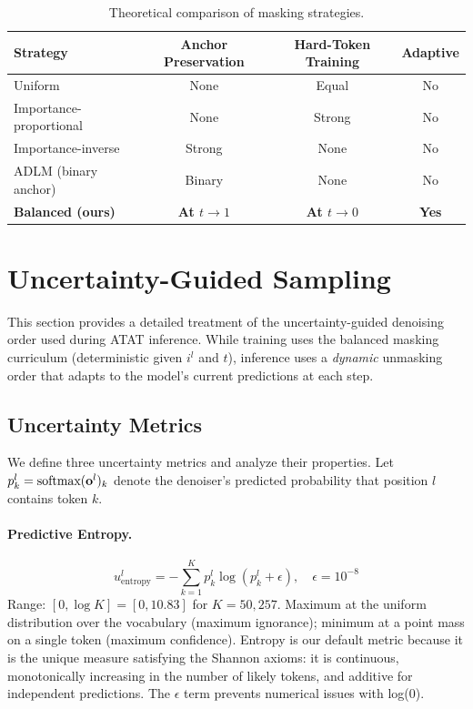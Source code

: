 \begin{table}[h]
\centering
\caption{Theoretical comparison of masking strategies.}
\begin{tabular}{lccc}
\toprule
\textbf{Strategy} & \textbf{Anchor Preservation} & \textbf{Hard-Token Training} & \textbf{Adaptive} \\
\midrule
Uniform & None & Equal & No \\
Importance-proportional & None & Strong & No \\
Importance-inverse & Strong & None & No \\
ADLM (binary anchor) & Binary & None & No \\
\textbf{Balanced (ours)} & \textbf{At $t{\to}1$} & \textbf{At $t{\to}0$} & \textbf{Yes} \\
\bottomrule
\end{tabular}
\end{table}

\section{Uncertainty-Guided Sampling}
\label{app:uncertainty}

This section provides a detailed treatment of the uncertainty-guided denoising order used during ATAT inference. While training uses the balanced masking curriculum (deterministic given $i^l$ and $t$), inference uses a \emph{dynamic} unmasking order that adapts to the model's current predictions at each step.

\subsection{Uncertainty Metrics}

We define three uncertainty metrics and analyze their properties. Let $p^l_k = \text{softmax}(\mathbf{o}^l)_k$ denote the denoiser's predicted probability that position $l$ contains token $k$.

\paragraph{Predictive Entropy.}
\begin{equation}
    u^l_{\text{entropy}} = -\sum_{k=1}^K p^l_k \log(p^l_k + \epsilon), \quad \epsilon = 10^{-8}
\end{equation}
Range: $[0, \log K] = [0, 10.83]$ for $K = 50{,}257$. Maximum at the uniform distribution over the vocabulary (maximum ignorance); minimum at a point mass on a single token (maximum confidence). Entropy is our default metric because it is the unique measure satisfying the Shannon axioms: it is continuous, monotonically increasing in the number of likely tokens, and additive for independent predictions. The $\epsilon$ term prevents numerical issues with log(0).

